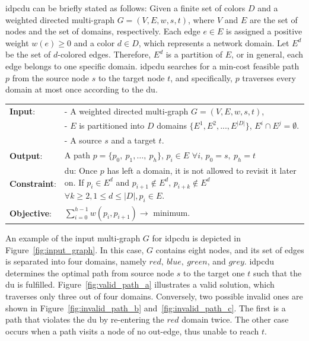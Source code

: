 \gls{idpcdu} can be briefly stated as follows: Given a finite set of colors $D$ and a weighted directed multi-graph $G=(V, E, w, s, t)$, where $V$ and $E$ are the set of nodes and the set of domains, respectively. Each edge $e \in E$ is assigned a positive weight $w(e) \geq 0$ and a color $d \in D$, which represents a network domain. Let $E^d$ be the set of $d$-colored edges. Therefore, $E^d$ is a partition of $E$, or in general, each edge belongs to one specific domain. \gls{idpcdu} searches for a min-cost feasible path $p$ from the source node $s$ to the target node $t$, and specifically, $p$ traverses every domain at most once according to the \gls{du}.

\begin{center}
	\begin{tabular}{lp{10cm}}
		\hline 
		\textbf{Input}:	&- A weighted directed multi-graph 
		$G = (V, E, w, s, t)$,\\
		&- $E$ is partitioned into $D$ domains $\{E^1, E^2, . . ., E^{|D|}\}$, $E^i \cap E^j = \emptyset$.\\
		&  - A source $s$ and a target $t$.\\
		\hline
		\textbf{Output}: &  A path $p = \{p_0,~p_1,\dots,~p_h\}$, $p_i \in E$ $\forall i$, $p_0 = s,~p_h = t$\\
		\hline 
		\textbf{Constraint}: & \gls{du}: Once $p$ has left a domain, it is not allowed to revisit it later on. If $p_{i} \in E^d$ and $p_{i+1} \notin E^d$, $p_{i+k} \notin E^d$  $\forall k\geq2, 1\le d \le |D|, p_i \in E$. \\
		\hline 
		\textbf{Objective}: & $\displaystyle \sum_{i =0 }^{h-1} w(p_i,p_{i+1}) \rightarrow $ minimum.\\
		\hline 
	\end{tabular}
\end{center}
\bigskip
An example of the input multi-graph $G$ for \gls{idpcdu} is depicted in Figure~\ref{fig:input_graph}. In this case, $G$ contains eight nodes, and its set of edges is separated into four domains, namely $red,~blue,~green$, and $grey$. \gls{idpcdu} determines the optimal path from source node $s$ to the target one $t$ such that the \gls{du} is fulfilled. Figure~\ref{fig:valid_path_a} illustrates a valid solution, which traverses only three out of four domains. Conversely, two possible invalid ones are shown in Figure~\ref{fig:invalid_path_b} and~\ref{fig:invalid_path_c}. The first is a path that violates the \gls{du} by re-entering the $red$ domain twice. The other case occurs when a path visits a node of no out-edge, thus unable to reach $t$.
